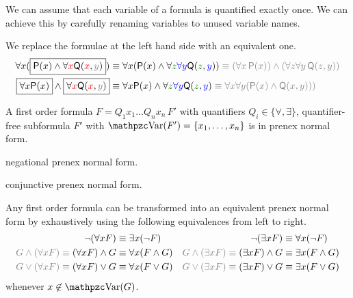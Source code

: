 
\noindent We can assume that each variable of a formula is quantified exactly once. 
We can achieve this by carefully renaming variables to unused variable names.

\begin{example}We replace the formulae at the left hand side with an equivalent one.
	\begin{align*}
	\forall x (\boxed{\mP(x) \land \forall {\colLo x} \mQ({\colLo x}, {\colG y})}) 
	&\equiv 
	\forall x (\mP(x) \land \forall {\colHi z}{\colN \forall y} \mQ({\colHi z}, {\colN y}))
	\colG \equiv (\forall x\, \mP(x)) \land (\forall z \forall y\, \mQ(z,y))
	\\
	\boxed{\forall x \mP(x)} \land \boxed{\forall {\colLo x} \mQ({\colLo x}, {\colG y})} 
	&\equiv 
	\forall x \mP(x) \land \forall {\colHi z}{\colN \forall y} \mQ({\colHi z}, {\colN y}) 
	\colG\equiv \forall x \forall y (\mP(x) \land \mQ(x,y))
	)\\
	\end{align*}
\end{example}

\begin{definition}\label{def:syntax:PNF}
	A first order formula $F = Q_1 x_1 \ldots Q_n x_n\, F'$ 
	with quantifiers $Q_i\in\{\forall,\exists\}$, 
	quantifier-free subformula $F'$ with $\var(F') = \{ x_1,\ldots,x_n \}$
	is in {\myem prenex normal form}.
\end{definition}

\begin{definition}\label{def:syntax:PNF}
	{\myem negational prenex normal form}.
\end{definition}

\begin{definition}\label{def:syntax:PNF}
	{\myem conjunctive prenex normal form}.
\end{definition}

\begin{lemma}
	Any first order formula can be transformed 
	into an equivalent prenex normal form 
	by exhaustively using the following equivalences from left to right.
	\begin{align*}
	\lnot(\forall x F) &\equiv \exists x (\lnot F)
	&
	\lnot(\exists x F) &\equiv \forall x (\lnot F)
	\\
	{\colG G \land (\forall x F) \equiv{}} (\forall x F) \land G &\equiv \forall x (F \land G)  
	&
	{\colG G \land (\exists x F) \equiv{}} (\exists x F) \land G &\equiv \exists x (F \land G)  
	\\
	{\colG G \lor (\forall x F) \equiv{}} (\forall x F) \lor G &\equiv \forall x (F \lor G) 
	&
	{\colG G \lor (\exists x F) \equiv{}} (\exists x F) \lor G &\equiv \exists x (F \lor G)
	\end{align*}
	whenever $x\not\in\var(G)$.
\end{lemma}

